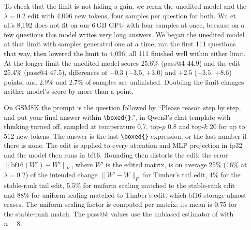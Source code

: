 To check that the limit is not hiding a gain, we reran the unedited model and
the $\lambda = 0.2$ edit with 4{,}096 new tokens, four samples per question
for both. Wu et al.'s 8{,}192 does not fit on our 6\,GB GPU with four samples
at once, because on a few questions this model writes very long answers. We
began the unedited model at that limit with samples generated one at a time,
ran the first 111 questions that way, then lowered the limit to 4{,}096; all
111 finished well within either limit. At the
longer limit the unedited model scores 25.6\% (pass@4 44.9) and the edit
25.4\% (pass@4 47.5), differences of $-0.3$ ($-3.5$, $+3.0$) and $+2.5$
($-3.5$, $+8.6$) points, and 2.9\% and 2.7\% of samples are unfinished.
Doubling the limit changes neither model's score by more than a point.

On GSM8K the prompt is the question followed by ``Please reason step by step, and
put your final answer within \verb|\boxed{}|.'', in Qwen3's chat template with
thinking turned off, sampled at temperature 0.7, top-$p$ 0.8 and top-$k$ 20 for
up to 512 new tokens. The answer is the last \verb|\boxed{}| expression, or the
last number if there is none. The edit is applied to every attention and MLP
projection in fp32 and the model then runs in bf16. Rounding then distorts the
edit: the error $\|\mathrm{bf16}(W') - W'\|_F$, where $W'$ is the edited
matrix, is on average 25\% (16\% at $\lambda=0.2$) of the intended change
$\|W' - W\|_F$ for Timber's
tail edit, 4\% for the stable-rank tail edit, 5.5\% for uniform scaling
matched to the stable-rank edit and 88\% for uniform scaling matched to
Timber's edit, which bf16 storage almost erases. The uniform scaling factor is
computed per matrix; its mean is 0.75 for the stable-rank match. The pass@$k$
values use the unbiased estimator of \citet{chen2021codex} with $n=8$.

